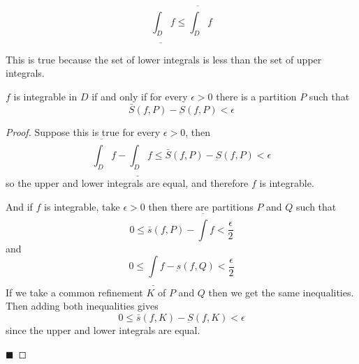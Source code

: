 \documentclass[10pt]{article}
\begin{document}
\begin{prop*}

    \[ \underline{\int_D}f\leq\overline{\int_D}f \]

\end{prop*}

This is true because the set of lower integrals is less than the set of upper integrals.

\begin{prop*}

    $f$ is integrable in $D$ if and only if for every $\epsilon>0$ there is a partition $P$ such that
    \[ \bar S(f,P) - \underbar S(f,P) < \epsilon \]

\end{prop*}

\begin{proof}

    Suppose this is true for every $\epsilon>0$, then
    \[ \overline{\int_D}f - \underline{\int_D}f \leq \bar S(f,P) - \underbar S(f,P) < \epsilon \]
    so the upper and lower integrals are equal, and therefore $f$ is integrable.

    And if $f$ is integrable, take $\epsilon>0$ then there are partitions $P$ and $Q$ such that
    \[ 0\leq \bar s(f,P) - \overline\int f < \frac\epsilon2 \]
    and
    \[ 0\leq \underline{\int} f - \underbar s(f,Q) < \frac\epsilon 2 \]
    If we take a common refinement $K$ of $P$ and $Q$ then we get the same inequalities.
    Then adding both inequalities gives
    \[ 0 \leq \bar s(f,K) - \underbar S(f,K) < \epsilon \]
    since the upper and lower integrals are equal.

    \hfill$\blacksquare$

\end{proof}
\end{document}
